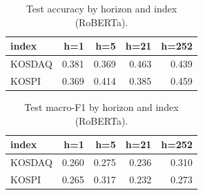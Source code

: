 \begin{table}[t]\centering
\caption{Test accuracy by horizon and index (RoBERTa).}
\begin{tabular}{lrrrr}
\toprule
index & h=1 & h=5 & h=21 & h=252 \\
\midrule
KOSDAQ & 0.381 & 0.369 & 0.463 & 0.439 \\
KOSPI & 0.369 & 0.414 & 0.385 & 0.459 \\
\bottomrule
\end{tabular}
\end{table}

\begin{table}[t]\centering
\caption{Test macro-F1 by horizon and index (RoBERTa).}
\begin{tabular}{lrrrr}
\toprule
index & h=1 & h=5 & h=21 & h=252 \\
\midrule
KOSDAQ & 0.260 & 0.275 & 0.236 & 0.310 \\
KOSPI & 0.265 & 0.317 & 0.232 & 0.273 \\
\bottomrule
\end{tabular}
\end{table}